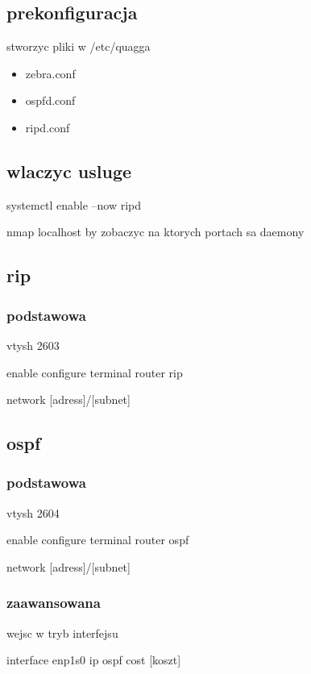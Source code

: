 \documentclass[11pt]{article}
\begin{document}
\subsection{prekonfiguracja}
\label{sec:org78dd927}
stworzyc pliki w /etc/quagga
\begin{itemize}
\item zebra.conf
\item ospfd.conf
\item ripd.conf
\end{itemize}
\subsection{wlaczyc usluge}
\label{sec:orgdcbd4bf}
systemctl enable --now ripd

nmap localhost by zobaczyc na ktorych portach sa daemony

\subsection{rip}
\label{sec:orgb1b1ebc}
\subsubsection{podstawowa}
\label{sec:org4d08e2b}
vtysh 2603

enable
configure terminal
router rip

network [adress]/[subnet]
\subsection{ospf}
\label{sec:orgb712f9b}
\subsubsection{podstawowa}
\label{sec:org9a351ba}
vtysh 2604

enable
configure terminal
router ospf

network [adress]/[subnet]
\subsubsection{zaawansowana}
\label{sec:org552ca33}
wejsc w tryb interfejsu

interface enp1s0
ip ospf cost [koszt]
\end{document}
